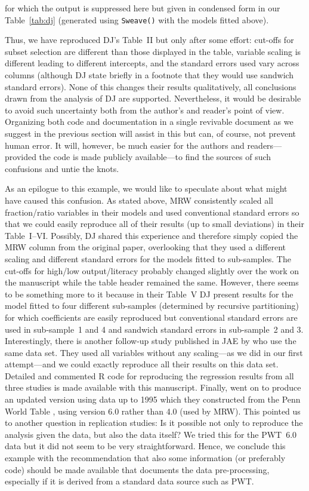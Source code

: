 \documentclass[10pt,a4paper,twoside]{article}
\let\code=\texttt
\let\proglang=\textsf
\begin{document}
for which the output is suppressed here but given in condensed form
in our Table~\ref{tab:dj} (generated using \code{Sweave()}
with the models fitted above). 

Thus, we have reproduced DJ's Table~II but only after some effort: cut-offs
for subset selection are different than those displayed in the table, variable scaling is different
leading to different intercepts, and the standard errors used vary across columns (although
DJ state briefly in a footnote that they would use sandwich standard errors). None of this
changes their results qualitatively, all conclusions drawn 
from the analysis of DJ are supported. 
Nevertheless, it would be desirable to avoid such uncertainty both from the author's
and reader's point of view. Organizing both code and documentation in a single revivable document
as we suggest in the previous section will assist in this but can, of
course, not prevent human error. It will, however, be much easier for the authors and readers---provided
the code is made publicly available---to find the sources of such confusions and untie the knots.

As an epilogue to this example, we would like to speculate about what might have caused 
this confusion. As stated above, MRW consistently scaled all fraction/ratio variables
in their models and used conventional standard errors so that we could easily reproduce
all of their results (up to small deviations) in their Table~I--VI. Possibly, DJ shared
this experience and therefore simply copied the MRW column from the original paper, overlooking
that they used a different scaling and different standard errors for the models fitted
to sub-samples. The cut-offs for high/low output/literacy probably changed slightly over
the work on the manuscript while the table header remained the same. However, there seems to 
be something more to it because in their Table~V DJ present results for the model fitted to
four different sub-samples (determined by recursive partitioning) for which coefficients
are easily reproduced but conventional standard errors are used in sub-sample~1 and 4 and
sandwich standard errors in sub-sample~2 and 3. Interestingly, there is another follow-up
study published in JAE by \cite{repro:Masanjala+Papageorgiou:2004} who use the same data
set. They used all variables without any scaling---as we did in our first attempt---and
we could exactly reproduce all their results on this data set. Detailed and
commented \proglang{R} code for reproducing the regression results from all three studies
is made available with this manuscript. Finally, \cite{repro:Masanjala+Papageorgiou:2004}
went on to produce an updated version using data up to 1995 which they constructed from
the Penn World Table \citep[PWT,][]{repro:Heston+Summers+Aten:2002}, using version 6.0
rather than 4.0 (used by MRW). This pointed us
to another question in replication studies: Is it possible not only to reproduce the
analysis given the data, but also the data itself? We tried this for the PWT~6.0 data but
it did not seem to be very straightforward. Hence, we conclude this example with the
recommendation that also some information (or preferably code) should be made available 
that documents the data pre-processing, especially if it is derived from a standard data
source such as PWT.
\end{document}
